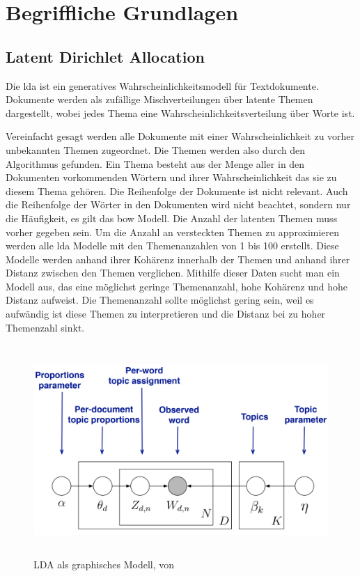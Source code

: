 \chapter{Begriffliche Grundlagen}

\section{Latent Dirichlet Allocation}
Die \acrfull{lda} ist ein generatives Wahrscheinlichkeitsmodell für Textdokumente. \parencite[vgl.][S. 996]{Blei03latentdirichlet} Dokumente werden als zufällige Mischverteilungen über latente Themen dargestellt, wobei jedes Thema eine Wahrscheinlichkeitsverteilung über Worte ist. 

Vereinfacht gesagt werden alle Dokumente mit einer Wahrscheinlichkeit zu vorher unbekannten Themen zugeordnet. Die Themen werden also durch den Algorithmus gefunden. Ein Thema besteht aus der Menge aller in den Dokumenten vorkommenden Wörtern und ihrer Wahrscheinlichkeit das sie zu diesem Thema gehören.
Die Reihenfolge der Dokumente ist nicht relevant. Auch die Reihenfolge der Wörter in den Dokumenten wird nicht beachtet, sondern nur die Häufigkeit, es gilt das \acl{bow} Modell. \parencite[vgl.][S. 155-156]{harris1954distributional} Die Anzahl der latenten Themen muss vorher gegeben sein.
Um die Anzahl an versteckten Themen zu approximieren werden alle \ac{lda} Modelle mit den Themenanzahlen von 1 bis 100 erstellt. Diese Modelle werden anhand ihrer Kohärenz innerhalb der Themen und anhand ihrer Distanz zwischen den Themen verglichen. Mithilfe dieser Daten sucht man ein Modell aus, das eine möglichst geringe Themenanzahl, hohe Kohärenz und hohe Distanz aufweist. Die Themenanzahl sollte möglichst gering sein, weil es aufwändig ist diese Themen zu interpretieren und die Distanz bei zu hoher Themenzahl sinkt.

\begin{figure}[htpb]
	\centering
	\includegraphics[width=\textwidth,height=8cm,keepaspectratio=true]{lda.png}
	\caption{
		LDA als graphisches Modell, von \parencite[vgl.][S. 23]{ProbabilisticTopicModels}
	}
	\label{fig:LDA Modell}
\end{figure}


